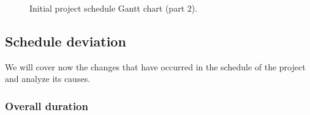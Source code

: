 \begin{figure}[hbtp]
	\caption{Initial project schedule Gantt chart (part 2).}
	\label{fig:gantt-2}
\end{figure}

\clearpage

\subsection{Schedule deviation}
\label{Management:Schedule:Final}

We will cover now the changes that have occurred in the schedule of the project and analyze its causes.

\subsubsection{Overall duration}

